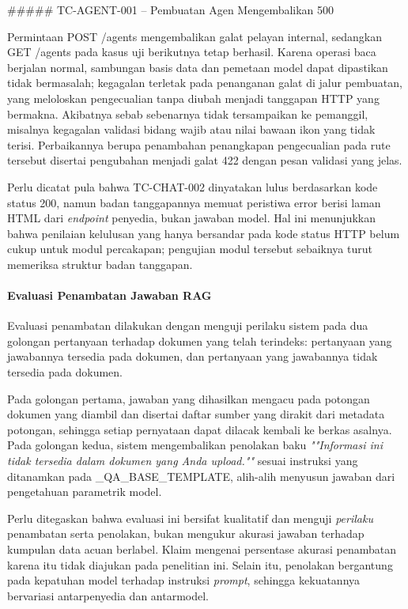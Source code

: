 \documentclass[12pt,a4paper]{article}
\begin{document}
\#\#\#\#\# TC-AGENT-001 -- Pembuatan Agen Mengembalikan 500

Permintaan POST /agents mengembalikan galat pelayan internal, sedangkan GET /agents pada kasus uji berikutnya tetap berhasil. Karena operasi baca berjalan normal, sambungan basis data dan pemetaan model dapat dipastikan tidak bermasalah; kegagalan terletak pada penanganan galat di jalur pembuatan, yang meloloskan pengecualian tanpa diubah menjadi tanggapan HTTP yang bermakna. Akibatnya sebab sebenarnya tidak tersampaikan ke pemanggil, misalnya kegagalan validasi bidang wajib atau nilai bawaan ikon yang tidak terisi. Perbaikannya berupa penambahan penangkapan pengecualian pada rute tersebut disertai pengubahan menjadi galat 422 dengan pesan validasi yang jelas.

Perlu dicatat pula bahwa TC-CHAT-002 dinyatakan lulus berdasarkan kode status 200, namun badan tanggapannya memuat peristiwa error berisi laman HTML dari \textit{endpoint} penyedia, bukan jawaban model. Hal ini menunjukkan bahwa penilaian kelulusan yang hanya bersandar pada kode status HTTP belum cukup untuk modul percakapan; pengujian modul tersebut sebaiknya turut memeriksa struktur badan tanggapan.

\paragraph*{Evaluasi Penambatan Jawaban RAG}
Evaluasi penambatan dilakukan dengan menguji perilaku sistem pada dua golongan pertanyaan terhadap dokumen yang telah terindeks: pertanyaan yang jawabannya tersedia pada dokumen, dan pertanyaan yang jawabannya tidak tersedia pada dokumen.

Pada golongan pertama, jawaban yang dihasilkan mengacu pada potongan dokumen yang diambil dan disertai daftar sumber yang dirakit dari metadata potongan, sehingga setiap pernyataan dapat dilacak kembali ke berkas asalnya. Pada golongan kedua, sistem mengembalikan penolakan baku \textit{""Informasi ini tidak tersedia dalam dokumen yang Anda upload.""} sesuai instruksi yang ditanamkan pada \_QA\_BASE\_TEMPLATE, alih-alih menyusun jawaban dari pengetahuan parametrik model.

Perlu ditegaskan bahwa evaluasi ini bersifat kualitatif dan menguji \textit{perilaku} penambatan serta penolakan, bukan mengukur akurasi jawaban terhadap kumpulan data acuan berlabel. Klaim mengenai persentase akurasi penambatan karena itu tidak diajukan pada penelitian ini. Selain itu, penolakan bergantung pada kepatuhan model terhadap instruksi \textit{prompt}, sehingga kekuatannya bervariasi antarpenyedia dan antarmodel.
\end{document}
